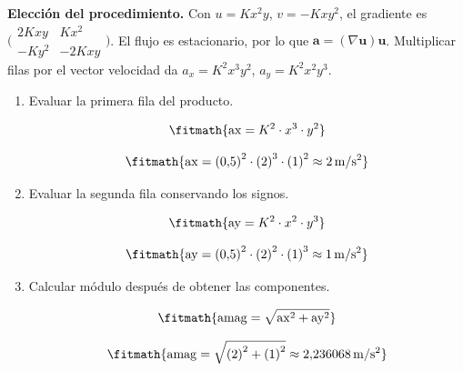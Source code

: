 \noindent\textbf{Elección del procedimiento.} Con $u=Kx^2y$, $v=-Kxy^2$, el gradiente es $\bigl(\begin{smallmatrix}2Kxy&Kx^2\\-Ky^2&-2Kxy\end{smallmatrix}\bigr)$. El flujo es estacionario, por lo que $\boldsymbol a=(\nabla\boldsymbol u)\boldsymbol u$. Multiplicar filas por el vector velocidad da $a_x=K^2x^3y^2$, $a_y=K^2x^2y^3$.

\begin{enumerate}

\item Evaluar la primera fila del producto.

\[\fitmath{\mathrm{ax}={K}^{2}\cdot {x}^{3}\cdot {y}^{2}}\]

\[\fitmath{\mathrm{ax}={(0{,}5)}^{2}\cdot {(2)}^{3}\cdot {(1)}^{2}\approx 2\,\mathrm{m/s^{2}}}\]

\item Evaluar la segunda fila conservando los signos.

\[\fitmath{\mathrm{ay}={K}^{2}\cdot {x}^{2}\cdot {y}^{3}}\]

\[\fitmath{\mathrm{ay}={(0{,}5)}^{2}\cdot {(2)}^{2}\cdot {(1)}^{3}\approx 1\,\mathrm{m/s^{2}}}\]

\item Calcular módulo después de obtener las componentes.

\[\fitmath{\mathrm{amag}=\sqrt{{\mathrm{ax}}^{2}+{\mathrm{ay}}^{2}}}\]

\[\fitmath{\mathrm{amag}=\sqrt{{(2)}^{2}+{(1)}^{2}}\approx 2{,}236068\,\mathrm{m/s^{2}}}\]

\end{enumerate}
